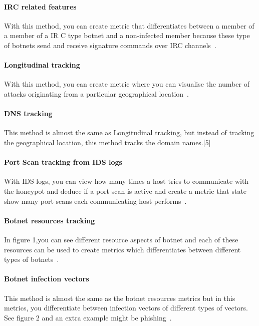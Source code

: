 \paragraph{IRC related features}
With this method, you can create metric that differentiates between a member of a member of a IR C type botnet and a non-infected member because these type of botnets  send and receive signature commands over IRC channels~\cite{AM2006}.

\paragraph{Longitudinal tracking}
With this method, you can create metric where you can visualise the number of attacks originating from a particular geographical location~\cite{AM2006}.

\paragraph{DNS tracking}
This method is almost the same as Longitudinal tracking, but instead of tracking the geographical location, this method tracks the domain names.[5]

\paragraph{Port Scan tracking from IDS logs}
With IDS logs, you can view how many times a host tries to communicate with the honeypot and deduce if a port scan is active and create a metric that state show many port scans each communicating host performs~\cite{WP2010}.

\paragraph{Botnet resources tracking}
In figure 1,you can see different resource aspects of botnet and each of these resources can be used to create metrics which differentiates between different types of botnets~\cite{GJ2007}.


\paragraph{Botnet infection vectors}
This method is almost the same as the botnet resources metrics but in this metrics, you differentiate between  infection vectors of different types of vectors. See figure 2 and an extra example might be phishing~\cite{GJ2007}.


